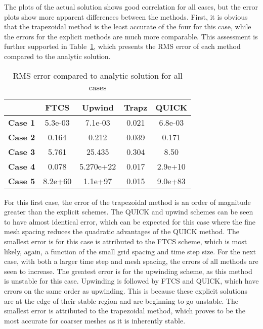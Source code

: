 \documentclass[twocolumn,10pt]{asme2ej}
\begin{document}
The plots of the actual solution shows good correlation for all cases, but the error plots show more apparent differences between the methods.  First, it is obvious that the trapezoidal method is the least accurate of the four for this case, while the errors for the explicit methods are much more comparable.  This assessment is further supported in Table~\ref{RMStable}, which presents the RMS error of each method compared to the analytic solution.

\begin{table}[htb]
\begin{center}
\label{RMStable}
\begin{tabular}{|c | c c c c|}
\hline
{} & \textbf{FTCS} & \textbf{Upwind} & \textbf{Trapz} & \textbf{QUICK} \\
\hline
\textbf{Case 1} & 5.3e-03 & 7.1e-03 & 0.021 & 6.8e-03 \\
\textbf{Case 2} & 0.164 & 0.212 & 0.039 & 0.171 \\
\textbf{Case 3} & 5.761 & 25.435 & 0.304 & 8.50 \\
\textbf{Case 4} & 0.078 & 5.270e+22 & 0.017 & 2.9e+10 \\
\textbf{Case 5} & 8.2e+60 & 1.1e+97 & 0.015 & 9.0e+83 \\
\hline
\end{tabular}
\caption{RMS error compared to analytic solution for all cases}
\end{center}
\end{table}

For this first case, the error of the trapezoidal method is an order of magnitude greater than the explicit schemes.  The QUICK and upwind schemes can be seen to have almost identical error, which can be expected for this case where the fine mesh spacing reduces the quadratic advantages of the QUICK method.  The smallest error is for this case is attributed to the FTCS scheme, which is most likely, again, a function of the small grid spacing and time step size.  For the next case, with both a larger time step and mesh spacing, the errors of all methods are seen to increase.  The greatest error is for the upwinding scheme, as this method is unstable for this case.  Upwinding is followed by FTCS and QUICK, which have errors on the same order as upwinding.  This is because these explicit solutions are at the edge of their stable region and are beginning to go unstable.  The smallest error is attributed to the trapezoidal method, which proves to be the most accurate for coarser meshes as it is inherently stable.  
\end{document}

